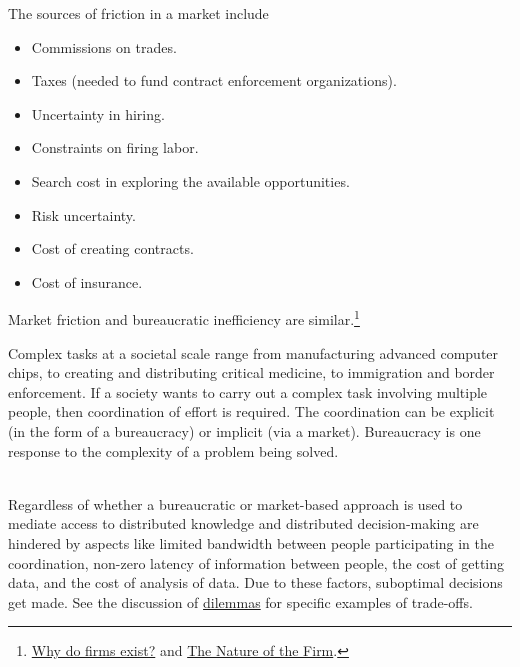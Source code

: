The sources of friction in a market include
\begin{itemize}
    \item Commissions on trades.
    \item Taxes (needed to fund contract enforcement organizations).
    \item Uncertainty in hiring.
    \item Constraints on firing labor.
    \item Search cost in exploring the available opportunities.
    \item Risk uncertainty.
    \item Cost of creating contracts.
    \item Cost of insurance.
\end{itemize}
Market friction and bureaucratic inefficiency are similar.\footnote{ 
\href{http://www.economist.com/node/17730360}{Why do firms exist?} and \href{https://en.wikipedia.org/wiki/The_Nature_of_the_Firm}{The Nature of the Firm}.
}

Complex tasks at a societal scale range from manufacturing advanced computer chips, to creating and distributing critical medicine, to immigration and border enforcement. 
If a society wants to carry out a complex task involving multiple people, then coordination of effort is required. The coordination can be explicit (in the form of a bureaucracy) or implicit (via a market).  Bureaucracy is one response to the complexity of a problem being solved.


\ \\

Regardless of whether a bureaucratic or market-based approach is used to mediate access to \iftoggle{glossarysubstitutionworks}{\glspl{shared resource}, }{shared resources, }
distributed knowledge and distributed decision-making are hindered by aspects like
limited bandwidth between people participating in the coordination,
non-zero latency of information between people,
the cost of getting data,
and
the cost of analysis of data.
Due to these factors, suboptimal decisions get made. See  %
the discussion of 
\hyperref[sec:dilemma-trilemma]{dilemmas}
for specific examples of trade-offs.

